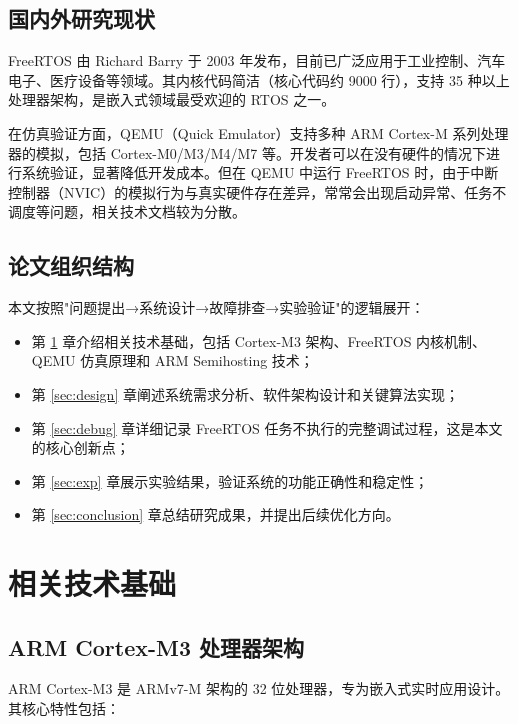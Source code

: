 \documentclass[12pt,a4paper]{ctexart}
\begin{document}
\subsection{国内外研究现状}

FreeRTOS 由 Richard Barry 于 2003 年发布，目前已广泛应用于工业控制、汽车电子、医疗设备等领域。其内核代码简洁（核心代码约 9000 行），支持 35 种以上处理器架构，是嵌入式领域最受欢迎的 RTOS 之一。

在仿真验证方面，QEMU（Quick Emulator）支持多种 ARM Cortex-M 系列处理器的模拟，包括 Cortex-M0/M3/M4/M7 等。开发者可以在没有硬件的情况下进行系统验证，显著降低开发成本。但在 QEMU 中运行 FreeRTOS 时，由于中断控制器（NVIC）的模拟行为与真实硬件存在差异，常常会出现启动异常、任务不调度等问题，相关技术文档较为分散。

\subsection{论文组织结构}

本文按照"问题提出→系统设计→故障排查→实验验证"的逻辑展开：

\begin{itemize}[leftmargin=2em]
    \item 第 \ref{sec:tech} 章介绍相关技术基础，包括 Cortex-M3 架构、FreeRTOS 内核机制、QEMU 仿真原理和 ARM Semihosting 技术；
    \item 第 \ref{sec:design} 章阐述系统需求分析、软件架构设计和关键算法实现；
    \item 第 \ref{sec:debug} 章详细记录 FreeRTOS 任务不执行的完整调试过程，这是本文的核心创新点；
    \item 第 \ref{sec:exp} 章展示实验结果，验证系统的功能正确性和稳定性；
    \item 第 \ref{sec:conclusion} 章总结研究成果，并提出后续优化方向。
\end{itemize}

\section{相关技术基础}\label{sec:tech}

\subsection{ARM Cortex-M3 处理器架构}

ARM Cortex-M3 是 ARMv7-M 架构的 32 位处理器，专为嵌入式实时应用设计。其核心特性包括：
\end{document}
